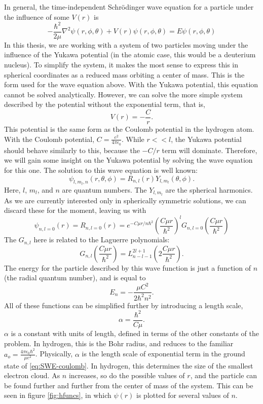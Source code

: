 \documentclass[12pt,twoside]{reedthesis}
\newcommand{\eqn}[1]{\begin{equation}#1\end{equation}}
\begin{document}
In general, the time-independent Schr\"odinger wave equation for a particle under the influence of some $V(r)$ is
\eqn{
-\frac{\hbar^2}{2\mu}\nabla^2\psi(r,\phi,\theta) + V(r)\psi (r,\phi,\theta) = E \psi(r,\phi,\theta)
\label{eq:TIDSWE-general}
}
In this thesis, we are working with a system of two particles moving under the influence of the Yukawa potential (in the atomic case, this would be a deuterium nucleus). To simplify the system, it makes the most sense to express this in spherical coordinates as a reduced mass orbiting a center of mass. This is the form used for the wave equation above. With the Yukawa potential, this equation cannot be solved analytically. However, we can solve the more simple system described by the potential without the exponential term, that is,
\eqn{
 V(r) = -\frac{C}{r}\mbox{.}
 }
This potential is the same form as the Coulomb potential in the hydrogen atom. With the Coulomb potential, $C = \frac{e^2}{4\pi \epsilon_0}$. While $r << l$, the Yukawa potential should behave similarly to this, because the $-C/r$ term will dominate. Therefore, we will gain some insight on the Yukawa potential by solving the wave equation for this one.
The solution to this wave equation is well known:
\eqn{
\psi_{l, m_l, n} (r, \theta, \phi) = R_{n,l}(r) Y_{l,m_l}(\theta,\phi)\mbox{.}
}
Here, $l$, $m_l$, and $n$ are quantum numbers. The $Y_{l, m_l}$ are the spherical harmonics. As we are currently interested only in spherically symmetric solutions, we can discard these for the moment, leaving us with
\eqn{
\psi_{n, l =0}(r) = R_{n , l= 0}(r) = e^{-C \mu r / n \hbar^2}\left(\frac{C \mu r}{\hbar^2}\right)^{l} G_{n, l = 0}\left(\frac{C \mu r}{\hbar^2}\right)
\label{eq:SWE-coulomb}
}
The $G_{n,l}$ here is related to the Laguerre polynomials:
\eqn{
G_{n,l}\left(\frac{C \mu r}{\hbar^2}\right) = L^{2l + 1 }_{n- l -1} \left(2\frac{C \mu r}{\hbar^2}\right)\mbox{.}
}
The energy for the particle described by this wave function is just a function of $n$ (the radial quantum number), and is equal to
\eqn{
E_n = -\frac{\mu C^2}{2\hbar^2 n^2}\mbox{.}
}
All of these functions can be simplified further by introducing a length scale, 
\eqn{
\alpha = \frac{\hbar^2}{C \mu}\mbox{.}
\label{eq:bohrradius}
}
$\alpha$ is a constant with units of length, defined in terms of the other constants of the problem. In hydrogen, this is the Bohr radius, and reduces to the familiar $a_o = \frac{4\pi \epsilon_0 \hbar^2}{\mu e^2}$. Physically, $\alpha$ is the length scale of exponential term in the ground state of \eqref{eq:SWE-coulomb}. In hydrogen, this determines the size of the smallest electron cloud. As $n$ increases, so do the possible values of $r$, and the particle can be found further and further from the center of mass of the system. This can be seen in figure \ref{fig:hfuncs}, in which $\psi(r)$ is plotted for several values of $n$.
\end{document}
